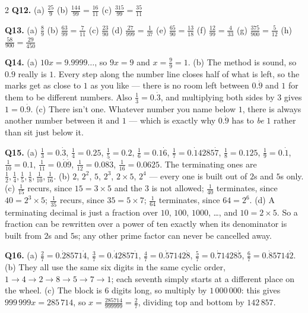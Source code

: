 \documentclass[12pt,a4paper]{article}
\begin{document}
{\begin{multicols}{2}
\textbf{Q12.} (a) $\tfrac{25}{9}$ \quad (b) $\tfrac{144}{99}=\tfrac{16}{11}$
\quad (c) $\tfrac{315}{99}=\tfrac{35}{11}$

\textbf{Q13.} (a) $\tfrac{8}{9}$ \quad (b) $\tfrac{63}{99}=\tfrac{7}{11}$
\quad (c) $\tfrac{23}{90}$ \quad (d) $\tfrac{27}{999}=\tfrac{1}{37}$ \quad
(e) $\tfrac{65}{90}=\tfrac{13}{18}$ \quad (f) $\tfrac{12}{99}=\tfrac{4}{33}$
\quad (g) $\tfrac{375}{900}=\tfrac{5}{12}$ \quad
(h) $\tfrac{58}{900}=\tfrac{29}{450}$

\textbf{Q14.} (a) $10x=9.9999\ldots$, so $9x=9$ and $x=\tfrac{9}{9}=1$.
\quad (b) The method is sound, so $0.\dot{9}$ really is $1$. Every step along
the number line closes half of what is left, so the marks get as close to $1$
as you like --- there is no room left between $0.\dot{9}$ and $1$ for them to
be different numbers. Also $\frac{1}{3}=0.\dot{3}$, and multiplying both sides
by $3$ gives $1=0.\dot{9}$. \quad (c) There isn't one. Whatever number you
name below $1$, there is always another number between it and $1$ --- which is
exactly why $0.\dot{9}$ has to \emph{be} $1$ rather than sit just below it.

\textbf{Q15.} (a) $\tfrac{1}{3}=0.\dot{3}$, $\tfrac{1}{4}=0.25$,
$\tfrac{1}{5}=0.2$, $\tfrac{1}{6}=0.1\dot{6}$,
$\tfrac{1}{7}=0.\dot{1}4285\dot{7}$, $\tfrac{1}{8}=0.125$,
$\tfrac{1}{9}=0.\dot{1}$, $\tfrac{1}{10}=0.1$,
$\tfrac{1}{11}=0.\dot{0}\dot{9}$, $\tfrac{1}{12}=0.08\dot{3}$,
$\tfrac{1}{16}=0.0625$. The terminating ones are
$\tfrac{1}{2},\tfrac{1}{4},\tfrac{1}{5},\tfrac{1}{8},\tfrac{1}{10},
\tfrac{1}{16}$. \quad
(b) $2$, $2^2$, $5$, $2^3$, $2\times5$, $2^4$ --- every one is built out of
$2$s and $5$s only. \quad
(c) $\tfrac{1}{15}$ recurs, since $15=3\times5$ and the $3$ is not allowed;
$\tfrac{1}{40}$ terminates, since $40=2^3\times5$; $\tfrac{1}{35}$ recurs,
since $35=5\times7$; $\tfrac{1}{64}$ terminates, since $64=2^6$. \quad
(d) A terminating decimal is just a fraction over $10$, $100$, $1000$,
\ldots, and $10=2\times5$. So a fraction can be rewritten over a power of ten
exactly when its denominator is built from $2$s and $5$s; any other prime
factor can never be cancelled away.

\textbf{Q16.} (a) $\tfrac{2}{7}=0.\dot{2}8571\dot{4}$,
$\tfrac{3}{7}=0.\dot{4}2857\dot{1}$, $\tfrac{4}{7}=0.\dot{5}7142\dot{8}$,
$\tfrac{5}{7}=0.\dot{7}1428\dot{5}$, $\tfrac{6}{7}=0.\dot{8}5714\dot{2}$.
\quad (b) They all use the same six digits in the same cyclic order,
$1\to4\to2\to8\to5\to7\to1$; each seventh simply starts at a different place
on the wheel. \quad (c) The block is $6$ digits long, so multiply by
$1\,000\,000$: this gives $999\,999x=285\,714$, so
$x=\tfrac{285714}{999999}=\tfrac{2}{7}$, dividing top and bottom by
$142\,857$.


\end{multicols}}
\end{document}
